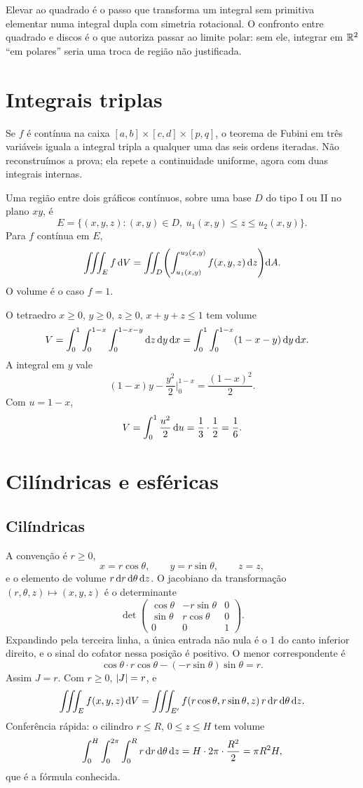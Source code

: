 \documentclass[11pt,a4paper]{article}
\begin{document}
Elevar ao quadrado é o passo que transforma um integral sem primitiva elementar numa integral dupla com simetria rotacional. O confronto entre quadrado e discos é o que autoriza passar ao limite polar: sem ele, integrar em $\mathbb{R}^2$ ``em polares'' seria uma troca de região não justificada.

\section{Integrais triplas}

Se $f$ é contínua na caixa $[a,b]\times[c,d]\times[p,q]$, o teorema de Fubini em três variáveis iguala a integral tripla a qualquer uma das seis ordens iteradas. Não reconstruímos a prova; ela repete a continuidade uniforme, agora com duas integrais internas.

Uma região entre dois gráficos contínuos, sobre uma base $D$ do tipo I ou II no plano $xy$, é
\[
E=\bigl\{(x,y,z):(x,y)\in D,\ u_1(x,y)\le z\le u_2(x,y)\bigr\}.
\]
Para $f$ contínua em $E$,
\[
\iiint_E f\,\mathrm{d} V
=\iint_D\Biggl(\int_{u_1(x,y)}^{u_2(x,y)} f(x,y,z)\,\mathrm{d} z\Biggr)\mathrm{d} A.
\]
O volume é o caso $f=1$.

\begin{exemplo}
O tetraedro $x\ge 0$, $y\ge 0$, $z\ge 0$, $x+y+z\le 1$ tem volume
\begin{align*}
V
&=\int_0^1\int_0^{1-x}\int_0^{1-x-y}\mathrm{d} z\,\mathrm{d} y\,\mathrm{d} x
=\int_0^1\int_0^{1-x}(1-x-y)\,\mathrm{d} y\,\mathrm{d} x.
\end{align*}
A integral em $y$ vale
\[
(1-x)y-\frac{y^2}{2}\Big|_{0}^{1-x}=\frac{(1-x)^2}{2}.
\]
Com $u=1-x$,
\[
V=\int_0^1\frac{u^2}{2}\,\mathrm{d} u=\frac13\cdot\frac12=\frac16.
\]
\end{exemplo}

\section{Cilíndricas e esféricas}

\subsection{Cilíndricas}

A convenção é $r\ge 0$,
\[
x=r\cos\theta,\qquad y=r\sin\theta,\qquad z=z,
\]
e o elemento de volume $r\,\mathrm{d} r\,\mathrm{d}\theta\,\mathrm{d} z$. O jacobiano da transformação $(r,\theta,z)\mapsto(x,y,z)$ é o determinante
\[
\det\begin{pmatrix}
\cos\theta & -r\sin\theta & 0 \\
\sin\theta & r\cos\theta & 0 \\
0 & 0 & 1
\end{pmatrix}.
\]
Expandindo pela terceira linha, a única entrada não nula é o $1$ do canto inferior direito, e o sinal do cofator nessa posição é positivo. O menor correspondente é
\[
\cos\theta\cdot r\cos\theta-(-r\sin\theta)\sin\theta=r.
\]
Assim $J=r$. Com $r\ge 0$, $\left\lvert J \right\rvert=r$, e
\[
\iiint_E f(x,y,z)\,\mathrm{d} V
=\iiint_{E'} f(r\cos\theta,r\sin\theta,z)\,r\,\mathrm{d} r\,\mathrm{d}\theta\,\mathrm{d} z.
\]
Conferência rápida: o cilindro $r\le R$, $0\le z\le H$ tem volume
\[
\int_0^H\int_0^{2\pi}\int_0^R r\,\mathrm{d} r\,\mathrm{d}\theta\,\mathrm{d} z
=H\cdot 2\pi\cdot\frac{R^2}{2}=\pi R^2 H,
\]
que é a fórmula conhecida.
\end{document}
